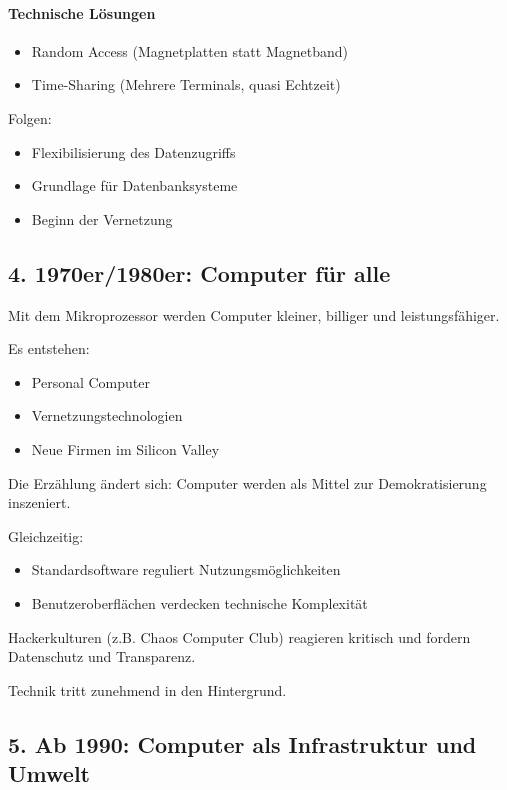 \paragraph{Technische Lösungen}

\begin{itemize}
    \item Random Access (Magnetplatten statt Magnetband)
    \item Time-Sharing (Mehrere Terminals, quasi Echtzeit)
\end{itemize}

Folgen:

\begin{itemize}
    \item Flexibilisierung des Datenzugriffs
    \item Grundlage für Datenbanksysteme
    \item Beginn der Vernetzung
\end{itemize}

\subsection{4. 1970er/1980er: Computer für alle}

Mit dem Mikroprozessor werden Computer kleiner, billiger und leistungsfähiger.

Es entstehen:

\begin{itemize}
    \item Personal Computer
    \item Vernetzungstechnologien
    \item Neue Firmen im Silicon Valley
\end{itemize}

Die Erzählung ändert sich:
Computer werden als Mittel zur Demokratisierung inszeniert.

Gleichzeitig:

\begin{itemize}
    \item Standardsoftware reguliert Nutzungsmöglichkeiten
    \item Benutzeroberflächen verdecken technische Komplexität
\end{itemize}

Hackerkulturen (z.B. Chaos Computer Club) reagieren kritisch und fordern 
Datenschutz und Transparenz.

Technik tritt zunehmend in den Hintergrund.

\subsection{5. Ab 1990: Computer als Infrastruktur und Umwelt}

